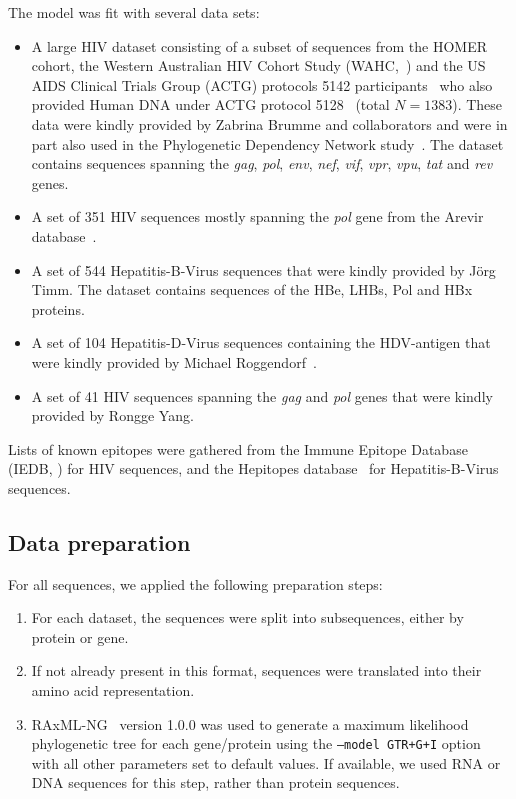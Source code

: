 \documentclass{bioinfo}
\begin{document}
\begin{methods}
The model was fit with several data sets:

\begin{itemize}
  \item A large HIV dataset consisting of a subset of sequences from the HOMER~\citep{Brumme2007, Brumme2008} cohort, the Western Australian HIV Cohort Study (WAHC,~\citet{Moore2002, Bhattacharya2007}) and the US AIDS Clinical Trials Group (ACTG) protocols 5142 participants~\citep{John2008} who also provided Human DNA under ACTG protocol 5128~\citep{haas2003multi} (total \(N=1383\)). These data were kindly provided by Zabrina Brumme and collaborators and were in part also used in the Phylogenetic Dependency Network study~\citep{Carlson2008}. The dataset contains sequences spanning the \textit{gag}, \textit{pol}, \textit{env}, \textit{nef}, \textit{vif}, \textit{vpr}, \textit{vpu}, \textit{tat} and \textit{rev} genes.
  \item A set of 351 HIV sequences mostly spanning the \textit{pol} gene from the Arevir database~\citep{Roomp2006}.
  \item A set of 544 Hepatitis-B-Virus sequences that were kindly provided by Jörg Timm. The dataset contains sequences of the HBe, LHBs, Pol and HBx proteins.
  \item A set of 104 Hepatitis-D-Virus sequences containing the HDV-antigen that were kindly provided by Michael Roggendorf~\citep{Karimzadeh2018}.
  \item A set of 41 HIV sequences spanning the \textit{gag} and \textit{pol} genes that were kindly provided by Rongge Yang. 
\end{itemize}

Lists of known epitopes were gathered from the Immune Epitope Database (IEDB, \citet{Vita2019}) for HIV sequences, and the Hepitopes database~\cite{Lumley2016} for Hepatitis-B-Virus sequences. 

\subsection{Data preparation}
For all sequences, we applied the following preparation steps:

\begin{enumerate}
  \item For each dataset, the sequences were split into subsequences, either by protein or gene.
  \item If not already present in this format, sequences were translated into their amino acid representation.
  \item RAxML-NG~\citep{Kozlov2019} version 1.0.0 was used to generate a maximum likelihood phylogenetic tree for each gene/protein using the \texttt{--model GTR+G+I} option with all other parameters set to default values. If available, we used RNA or DNA sequences for this step, rather than protein sequences.
\end{enumerate}

\end{methods}
\end{document}
